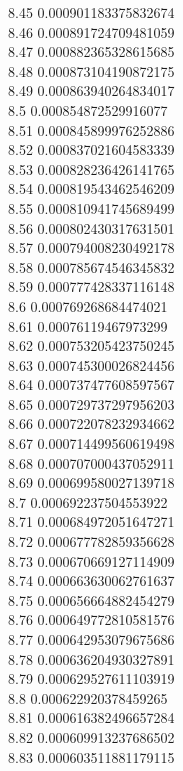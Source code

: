 {8.45	0.000901183375832674\\
8.46	0.000891724709481059\\
8.47	0.000882365328615685\\
8.48	0.000873104190872175\\
8.49	0.000863940264834017\\
8.5	0.000854872529916077\\
8.51	0.000845899976252886\\
8.52	0.000837021604583339\\
8.53	0.000828236426141765\\
8.54	0.000819543462546209\\
8.55	0.000810941745689499\\
8.56	0.000802430317631501\\
8.57	0.000794008230492178\\
8.58	0.000785674546345832\\
8.59	0.000777428337116148\\
8.6	0.000769268684474021\\
8.61	0.00076119467973299\\
8.62	0.000753205423750245\\
8.63	0.000745300026824456\\
8.64	0.000737477608597567\\
8.65	0.000729737297956203\\
8.66	0.000722078232934662\\
8.67	0.000714499560619498\\
8.68	0.000707000437052911\\
8.69	0.000699580027139718\\
8.7	0.000692237504553922\\
8.71	0.000684972051647271\\
8.72	0.000677782859356628\\
8.73	0.000670669127114909\\
8.74	0.000663630062761637\\
8.75	0.000656664882454279\\
8.76	0.000649772810581576\\
8.77	0.000642953079675686\\
8.78	0.000636204930327891\\
8.79	0.000629527611103919\\
8.8	0.000622920378459265\\
8.81	0.000616382496657284\\
8.82	0.000609913237686502\\
8.83	0.000603511881179115\\
}
